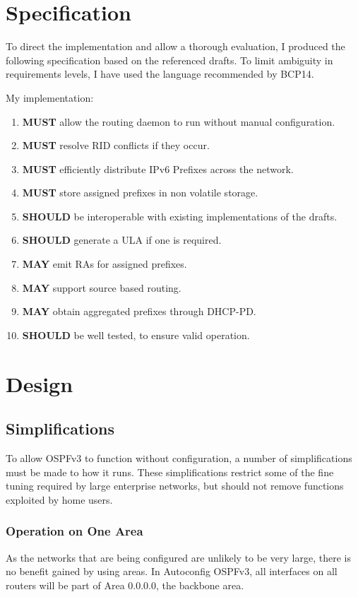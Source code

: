 \documentclass[12pt,a4paper,twoside]{report}
\begin{document}
\chapter{Specification}
To direct the implementation and allow a thorough evaluation, I produced the
following specification based on the referenced drafts. To limit
ambiguity in requirements levels, I have used the language recommended by BCP14.
\cite{rfc2119}

My implementation:
\begin{enumerate}
	\item \textbf{MUST} allow the routing daemon to run without manual configuration.
	\item \textbf{MUST} resolve RID conflicts if they occur.
	\item \textbf{MUST} efficiently distribute IPv6 Prefixes across the network.
	\item \textbf{MUST} store assigned prefixes in non volatile storage.
	\item \textbf{SHOULD} be interoperable with existing implementations of the drafts.
	\item \textbf{SHOULD} generate a ULA if one is required.
	\item \textbf{MAY} emit RAs for assigned prefixes.
	\item \textbf{MAY} support source based routing.
	\item \textbf{MAY} obtain aggregated prefixes through DHCP-PD. 
	\item \textbf{SHOULD} be well tested, to ensure valid operation.
\end{enumerate}

\chapter{Design}
\section{Simplifications}
To allow OSPFv3 to function without configuration, a number of simplifications
must be made to how it runs. These simplifications restrict some of the fine
tuning required by large enterprise networks, but should not remove functions
exploited by home users. 

\subsection{Operation on One Area}
As the networks that are being configured are unlikely to be very large, there
is no benefit gained by using areas. In Autoconfig OSPFv3, all
interfaces on all routers will be part of Area 0.0.0.0, the backbone area.
\end{document}
